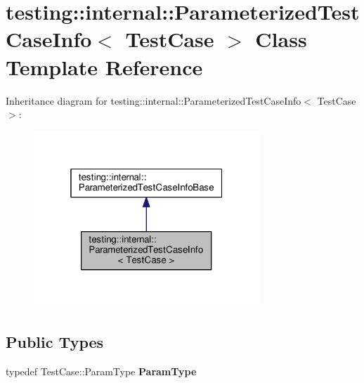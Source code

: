 \hypertarget{classtesting_1_1internal_1_1_parameterized_test_case_info}{}\section{testing\+:\+:internal\+:\+:Parameterized\+Test\+Case\+Info$<$ Test\+Case $>$ Class Template Reference}
\label{classtesting_1_1internal_1_1_parameterized_test_case_info}


Inheritance diagram for testing\+:\+:internal\+:\+:Parameterized\+Test\+Case\+Info$<$ Test\+Case $>$\+:
\nopagebreak
\begin{figure}[H]
\begin{center}
\leavevmode
\includegraphics[width=241pt]{classtesting_1_1internal_1_1_parameterized_test_case_info__inherit__graph}
\end{center}
\end{figure}
\subsection*{Public Types}
\begin{DoxyCompactItemize}
\item 
\mbox{\label{classtesting_1_1internal_1_1_parameterized_test_case_info_a643a87e178bf92a4246ce21054e44b96}} 
typedef Test\+Case\+::\+Param\+Type {\bfseries Param\+Type}
\end{DoxyCompactItemize}
